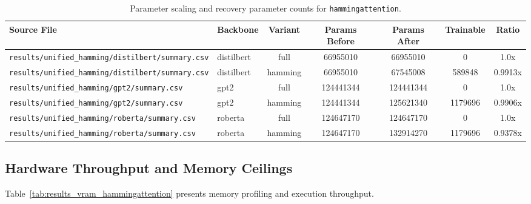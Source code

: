 \begin{table}[t]
\centering
\small
\begin{tabular}{llccccc}
\toprule
\textbf{Source File} & \textbf{Backbone} & \textbf{Variant} & \textbf{Params Before} & \textbf{Params After} & \textbf{Trainable} & \textbf{Ratio} \\
\midrule
\texttt{results/unified\_hamming/distilbert/summary.csv} & distilbert & full & 66955010 & 66955010 & 0 & 1.0x \\
\texttt{results/unified\_hamming/distilbert/summary.csv} & distilbert & hamming & 66955010 & 67545008 & 589848 & 0.9913x \\
\texttt{results/unified\_hamming/gpt2/summary.csv} & gpt2 & full & 124441344 & 124441344 & 0 & 1.0x \\
\texttt{results/unified\_hamming/gpt2/summary.csv} & gpt2 & hamming & 124441344 & 125621340 & 1179696 & 0.9906x \\
\texttt{results/unified\_hamming/roberta/summary.csv} & roberta & full & 124647170 & 124647170 & 0 & 1.0x \\
\texttt{results/unified\_hamming/roberta/summary.csv} & roberta & hamming & 124647170 & 132914270 & 1179696 & 0.9378x \\
\bottomrule
\end{tabular}
\caption{Parameter scaling and recovery parameter counts for \texttt{hammingattention}.}
\label{tab:results_params_hammingattention}
\end{table}

\subsection{Hardware Throughput and Memory Ceilings}
Table~\ref{tab:results_vram_hammingattention} presents memory profiling and execution throughput.


